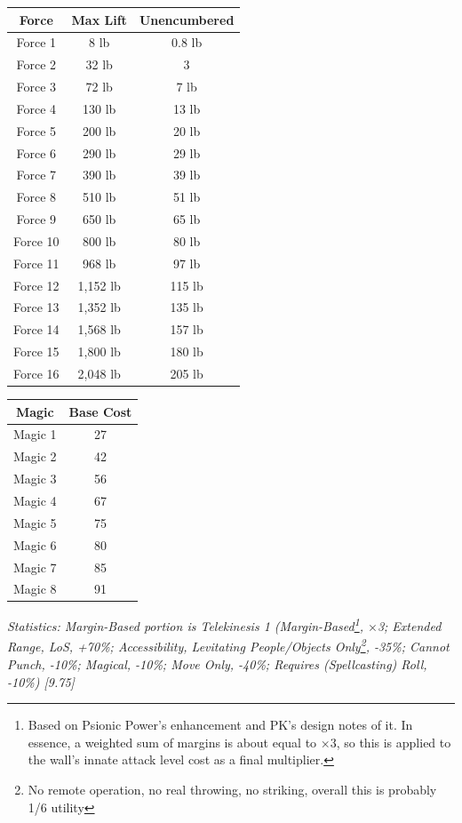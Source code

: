 \begin{multicols}{3}
	\begin{center}
		\begin{tabular}{|c|c|c|}
			\hline
			Force & Max Lift & Unencumbered\\
			\hline
			\hline
			Force 1 & 8 lb & 0.8 lb \\
			Force 2 & 32 lb & 3 \\
			Force 3 & 72 lb & 7 lb \\
			Force 4 & 130 lb & 13 lb \\
			Force 5 & 200 lb & 20 lb \\
			Force 6 & 290 lb & 29 lb \\
			Force 7 & 390 lb & 39 lb \\
			Force 8 & 510 lb & 51 lb \\
			Force 9 & 650 lb & 65 lb \\
			Force 10 & 800 lb & 80 lb \\
			Force 11 & 968 lb & 97 lb \\
			Force 12 & 1,152 lb & 115 lb \\
			Force 13 & 1,352 lb & 135 lb \\
			Force 14 & 1,568 lb & 157 lb \\
			Force 15 & 1,800 lb & 180 lb \\
			Force 16 & 2,048 lb & 205 lb \\
			\hline
		\end{tabular}
	\end{center}
	
	\begin{center}
		\begin{tabular}{|c|c|}
			\hline
			Magic & Base Cost \\
			\hline
			\hline
			Magic 1 & 27 \\
			Magic 2 & 42 \\
			Magic 3 & 56 \\
			Magic 4 & 67 \\
			Magic 5 & 75 \\
			Magic 6 & 80 \\
			Magic 7 & 85 \\
			Magic 8 & 91 \\
			\hline
		\end{tabular}
	\end{center}
	
	\textcolor{OliveGreen}{\textit{Statistics: Margin-Based portion is Telekinesis 1 (Margin-Based\footnote{Based on Psionic Power’s enhancement and PK’s design notes of it. In essence, a weighted sum of margins is about equal to ×3, so this is applied to the wall’s innate attack level cost as a final multiplier.}, $\times$3; Extended Range, LoS, +70\%; Accessibility, Levitating People/Objects Only\footnote{No remote operation, no real throwing, no striking, overall this is probably 1/6 utility}, -35\%; Cannot Punch, -10\%; Magical, -10\%; Move Only, -40\%; Requires (Spellcasting) Roll, -10\%) [9.75] }}
	

\end{multicols}

